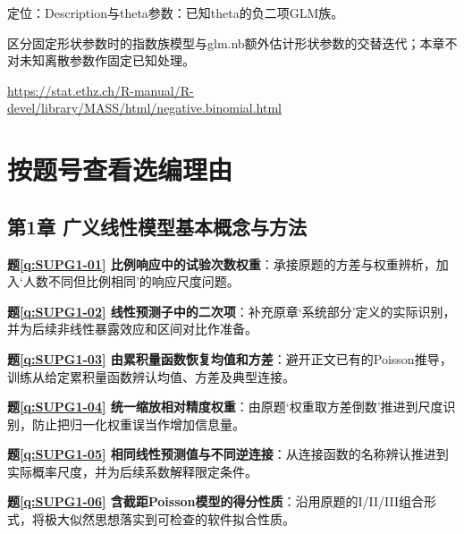 \par\noindent\begin{minipage}{\linewidth}\raggedright{}\label{src:G8-NB-FAMILY}
\par
定位：Description与theta参数：已知theta的负二项GLM族。\par
区分固定形状参数时的指数族模型与glm.nb额外估计形状参数的交替迭代；本章不对未知离散参数作固定已知处理。\par
{\small \url{https://stat.ethz.ch/R-manual/R-devel/library/MASS/html/negative.binomial.html}}\par
\end{minipage}\par\medskip

\section*{按题号查看选编理由}\begingroup\small\setlength{\parskip}{2pt}
\subsection*{第1章 广义线性模型基本概念与方法}

\noindent\textbf{题\ref*{q:SUPG1-01} 比例响应中的试验次数权重}：承接原题的方差与权重辨析，加入‘人数不同但比例相同’的响应尺度问题。\par

\noindent\textbf{题\ref*{q:SUPG1-02} 线性预测子中的二次项}：补充原章‘系统部分’定义的实际识别，并为后续非线性暴露效应和区间对比作准备。\par

\noindent\textbf{题\ref*{q:SUPG1-03} 由累积量函数恢复均值和方差}：避开正文已有的Poisson推导，训练从给定累积量函数辨认均值、方差及典型连接。\par

\noindent\textbf{题\ref*{q:SUPG1-04} 统一缩放相对精度权重}：由原题‘权重取方差倒数’推进到尺度识别，防止把归一化权重误当作增加信息量。\par

\noindent\textbf{题\ref*{q:SUPG1-05} 相同线性预测值与不同逆连接}：从连接函数的名称辨认推进到实际概率尺度，并为后续系数解释限定条件。\par

\noindent\textbf{题\ref*{q:SUPG1-06} 含截距Poisson模型的得分性质}：沿用原题的I/II/III组合形式，将极大似然思想落实到可检查的软件拟合性质。\par

